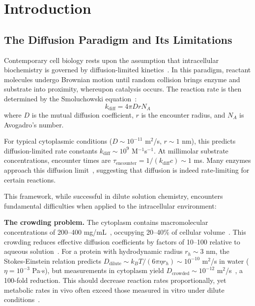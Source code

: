 \documentclass[twocolumn,10pt,aps,prd,superscriptaddress,floatfix,nofootinbib]{revtex4-2}
\theoremstyle{remark}
\begin{document}
\maketitle

\section{Introduction}
\label{sec:introduction}

\subsection{The Diffusion Paradigm and Its Limitations}

Contemporary cell biology rests upon the assumption that intracellular biochemistry is governed by diffusion-limited kinetics~\cite{Berg1993,Goodsell1991}. In this paradigm, reactant molecules undergo Brownian motion until random collision brings enzyme and substrate into proximity, whereupon catalysis occurs. The reaction rate is then determined by the Smoluchowski equation~\cite{Smoluchowski1917}:
\begin{equation}
k_{\mathrm{diff}} = 4\pi D r N_A
\label{eq:smoluchowski}
\end{equation}
where $D$ is the mutual diffusion coefficient, $r$ is the encounter radius, and $N_A$ is Avogadro's number.

For typical cytoplasmic conditions ($D \sim 10^{-11}$ m$^2$/s, $r \sim 1$ nm), this predicts diffusion-limited rate constants $k_{\mathrm{diff}} \sim 10^{9}$ M$^{-1}$s$^{-1}$. At millimolar substrate concentrations, encounter times are $\tau_{\mathrm{encounter}} = 1/(k_{\mathrm{diff}} c) \sim 1$ ms. Many enzymes approach this diffusion limit~\cite{Alberty1953}, suggesting that diffusion is indeed rate-limiting for certain reactions.

This framework, while successful in dilute solution chemistry, encounters fundamental difficulties when applied to the intracellular environment:

\textbf{The crowding problem.} The cytoplasm contains macromolecular concentrations of 200--400 mg/mL~\cite{Ellis2001,Zimmerman1993}, occupying 20--40\% of cellular volume~\cite{Luby-Phelps2000}. This crowding reduces effective diffusion coefficients by factors of 10--100 relative to aqueous solution~\cite{Verkman2002}. For a protein with hydrodynamic radius $r_h \sim 3$ nm, the Stokes-Einstein relation predicts $D_{\mathrm{dilute}} \sim k_B T/(6\pi\eta r_h) \sim 10^{-10}$ m$^2$/s in water ($\eta = 10^{-3}$ Pa$\cdot$s), but measurements in cytoplasm yield $D_{\mathrm{crowded}} \sim 10^{-12}$ m$^2$/s~\cite{Mika2010}, a 100-fold reduction. This should decrease reaction rates proportionally, yet metabolic rates in vivo often exceed those measured in vitro under dilute conditions~\cite{Srere1987}.
\end{document}
